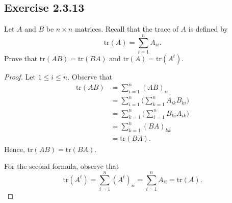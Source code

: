 \subsection*{Exercise 2.3.13} Let \( A  \) and \( B  \) be \( n \times n  \) matrices. Recall that the trace of \( A  \) is defined by
\[  \text{tr}(A) = \sum_{ i=1  }^{ n } {A}_{ii}. \]
Prove that \( \text{tr}(AB) = \text{tr}(BA) \) and \( \text{tr}(A) = \text{tr}(A^{t}) \).
\begin{proof}
    Let \( 1 \leq i \leq n \). Observe that
    \begin{align*}
        \text{tr}(AB) &= \sum_{ i=1  }^{ n } {(AB)}_{ii} \\
                      &= \sum_{ i=1  }^{ n } \Big( \sum_{ k=1  }^{ n } {A}_{ik } {B}_{ki} \Big) \\
                      &= \sum_{ k=1  }^{ n } \Big( \sum_{ i=1  }^{ n } {B}_{ki } {A}_{ik } \Big) \\
                      &= \sum_{ k=1  }^{ n } {(BA)}_{k k } \\
                      &= \text{tr}(BA).
    \end{align*}
    Hence, \( \text{tr}(AB) = \text{tr}(BA ) \).

   For the second formula, observe that
   \[  \text{tr}(A^{t}) = \sum_{ i=1  }^{ n   } {(A^{t})}_{ii} = \sum_{ i=1  }^{ n } {A}_{ii} = \text{tr}(A). \]
\end{proof}

